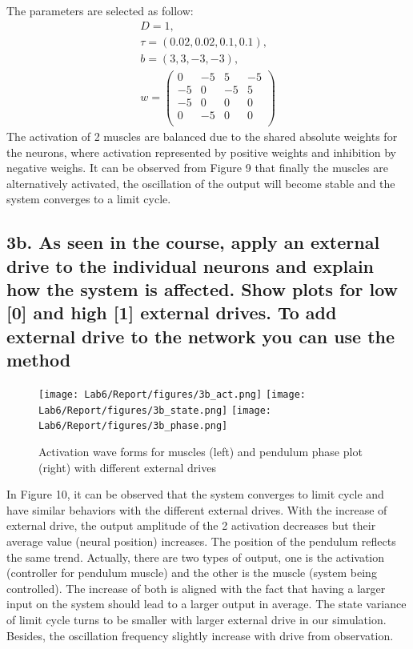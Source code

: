 \documentclass{cmc}
\begin{document}
The parameters are selected as follow:
\begin{gather} 
D = 1,\\
\tau=(0.02, 0.02, 0.1, 0.1),\\
b = (3, 3, -3, -3),\\
w=
\left( 
\begin{array}{cccc} 
0 & -5 & 5 & -5 \\ 
-5 & 0 & -5 & 5\\ 
-5 & 0 & 0 & 0 \\ 
0 & -5 & 0 & 0\\
\end{array}
\right) 
\end{gather}
The activation of 2 muscles are balanced due to the shared absolute weights for the neurons, where activation represented by positive weights and inhibition by negative weighs.
It can be observed from Figure 9 that finally the muscles are alternatively activated, the oscillation of the output will become stable and the system converges to a limit cycle.

\subsection*{3b. As seen in the course, apply an external drive to the
  individual neurons and explain how the system is affected. Show
  plots for low [0] and high [1] external drives. To add external
  drive to the network you can use the method \\
}
\label{sec:4c}

\begin{figure}[H]
  \centering
  \texttt{[image: Lab6/Report/figures/3b\_act.png]}
  \texttt{[image: Lab6/Report/figures/3b\_state.png]}
  \texttt{[image: Lab6/Report/figures/3b\_phase.png]}
  \caption{Activation wave forms for muscles (left) and pendulum phase plot (right) with different external drives}
  \label{3b}
\end{figure}



In Figure 10, it can be observed that the system converges to limit cycle and have similar behaviors with the different external drives.
With the increase of external drive, the output amplitude of the 2 activation decreases but their average value (neural position) increases. The position of the pendulum reflects the same trend. 
Actually, there are two types of output, one is the activation (controller for pendulum muscle) and the other is the muscle (system being controlled). The increase of both is aligned with the fact that having a larger input on the system should lead to a larger output in average.
 The state variance of limit cycle turns to be smaller with larger external drive in our simulation.
 Besides, the oscillation frequency slightly increase with drive from observation.
\end{document}
